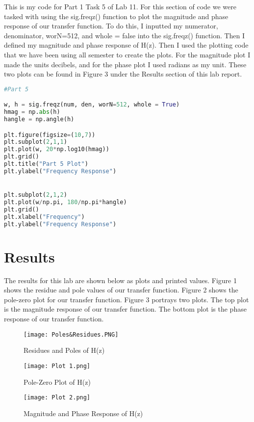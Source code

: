 \documentclass[12pt]{report}
\begin{document}
{This is my code for Part 1 Task 5 of Lab 11. For this section of code we were tasked with using the sig.freqz() function to plot the magnitude and phase response of our transfer function. To do this, I inputted my numerator, denominator, worN=512, and whole = false into the sig.freqz() function. Then I defined my magnitude and phase response of H(z). Then I used the plotting code that we have been using all semester to create the plots. For the magnitude plot I made the units decibels, and for the phase plot I used radians as my unit. These two plots can be found in Figure 3 under the Results section of this lab report.  }
\begin{lstlisting}[language=Python]
#Part 5

w, h = sig.freqz(num, den, worN=512, whole = True)
hmag = np.abs(h)
hangle = np.angle(h)

plt.figure(figsize=(10,7))
plt.subplot(2,1,1)
plt.plot(w, 20*np.log10(hmag))
plt.grid()
plt.title("Part 5 Plot")
plt.ylabel("Frequency Response")


plt.subplot(2,1,2)
plt.plot(w/np.pi, 180/np.pi*hangle)
plt.grid()
plt.xlabel("Frequency")
plt.ylabel("Frequency Response") 
\end{lstlisting}


\newpage
\section{Results}

The results for this lab are shown below as plots and printed values. Figure 1 shows the residue and pole values of our transfer function. Figure 2 shows the pole-zero plot for our transfer function. Figure 3 portrays two plots. The top plot is the magnitude response of our transfer function. The bottom plot is the phase response of our transfer function. 


\begin{figure}
\texttt{[image: Poles\&Residues.PNG]}
\caption{Residues and Poles of H(z)}
\end{figure}



\begin{figure}
\texttt{[image: Plot 1.png]}
\caption{Pole-Zero Plot of H(z)}
\end{figure}



\begin{figure}
\texttt{[image: Plot 2.png]}
\caption{Magnitude and Phase Response of H(z)}
\end{figure}
\end{document}
